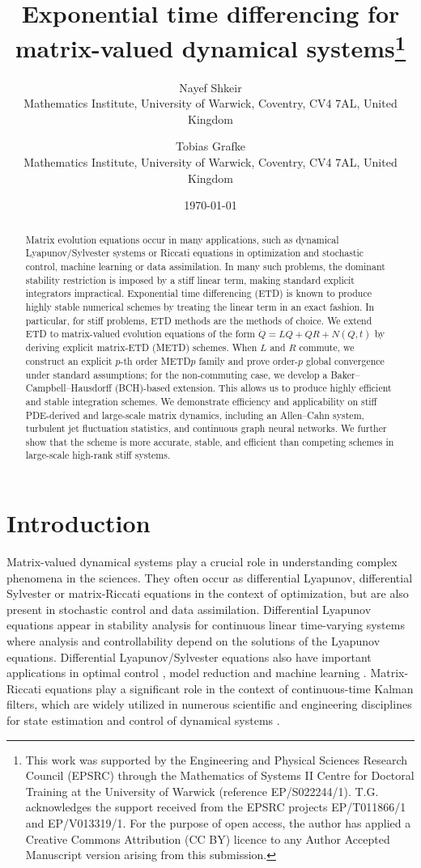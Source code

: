 \documentclass[12pt]{article}
\title{Exponential time differencing for matrix-valued dynamical systems\thanks{This work was supported by the Engineering and Physical Sciences Research Council (EPSRC) through the Mathematics of Systems II Centre for Doctoral Training at the University of Warwick (reference EP/S022244/1). T.G. acknowledges the support received from the EPSRC projects EP/T011866/1 and EP/V013319/1. For the purpose of open access, the author has applied a Creative Commons Attribution (CC BY) licence to any Author Accepted Manuscript version arising from this submission.}}
\date{\today}
\author{Nayef Shkeir\\
\small Mathematics Institute, University of Warwick, Coventry, CV4 7AL, United Kingdom\\
\and Tobias Grafke\\
\small Mathematics Institute, University of Warwick, Coventry, CV4 7AL, United Kingdom}
\begin{document}
\maketitle

\begin{abstract}
    Matrix evolution equations occur in many applications, such as dynamical Lyapunov/Sylvester systems or Riccati equations in optimization and stochastic control, machine learning or data assimilation. In many such problems, the dominant stability restriction is imposed by a stiff linear term, making standard explicit integrators impractical. Exponential time differencing (ETD) is known to produce highly stable numerical schemes by treating the linear term in an exact fashion. In particular, for stiff problems, ETD methods are the methods of choice. We extend ETD to matrix-valued evolution equations of the form $\dot Q = LQ + QR + N(Q,t)$ by deriving explicit matrix-ETD (METD) schemes. When $L$ and $R$ commute, we construct an explicit $p$-th order METD$p$ family and prove order-$p$ global convergence under standard assumptions; for the non-commuting case, we develop a Baker–Campbell–Hausdorff (BCH)-based extension. This allows us to produce highly efficient and stable integration schemes. We demonstrate efficiency and applicability on stiff PDE-derived and large-scale matrix dynamics, including an Allen–Cahn system, turbulent jet fluctuation statistics, and continuous graph neural networks. We further show that the scheme is more accurate, stable, and efficient than competing schemes in large-scale high-rank stiff systems.
\end{abstract}
\section{Introduction}

Matrix-valued dynamical systems play a crucial role in understanding complex phenomena in the sciences. They often occur as differential Lyapunov, differential Sylvester or matrix-Riccati equations in the context of optimization, but are also present in stochastic control and data assimilation. Differential Lyapunov equations appear in stability analysis for continuous linear time-varying systems \cite{amato2014finite} where analysis and controllability depend on the solutions of the Lyapunov equations. Differential Lyapunov/Sylvester equations also have important applications in optimal control \cite{athans2013optimal}, model reduction \cite{gugercin2008h_2} and machine learning \cite{pmlr-v119-xhonneux20a}. Matrix-Riccati equations play a significant role in the context of continuous-time Kalman filters, which are widely utilized in numerous scientific and engineering disciplines for state estimation and control of dynamical systems \cite{kalman1961new,ricatti_book}.
\end{document}
